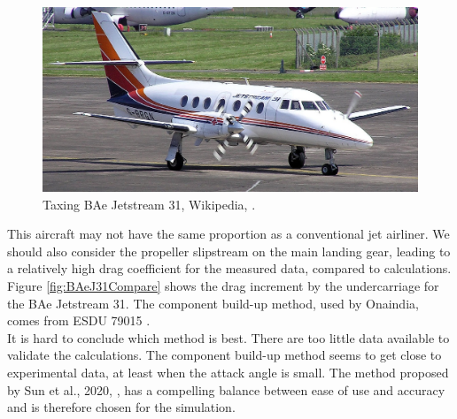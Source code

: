 \documentclass[english]{kththesis}
\begin{document}
\begin{figure}[hb]
    \centering
    \includegraphics[width=1\textwidth]{Epictures/1280px-Jetstream31.jpg}
    \caption{Taxing BAe Jetstream 31, Wikipedia, \cite{WikipediaBAeJ31}.}
    \label{fig:BAeJ31}
\end{figure}



This aircraft may not have the same proportion as a conventional jet airliner. We should also consider the propeller slipstream on the main landing gear, leading to a relatively high drag coefficient for the measured data, compared to calculations. Figure \ref{fig:BAeJ31Compare} shows the drag increment by the undercarriage for the BAe Jetstream 31. The component build-up method, used by Onaindia, comes from ESDU 79015 \cite{ESDU79015}.\\

It is hard to conclude which method is best. There are too little data available to validate the calculations. The component build-up method seems to get close to experimental data, at least when the attack angle is small. The method proposed by Sun et al., 2020, \cite{Sun2020}, has a compelling balance between ease of use and accuracy and is therefore chosen for the simulation.
\end{document}
